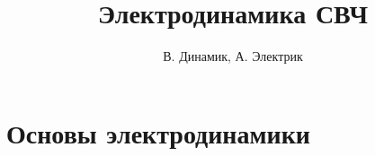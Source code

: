 \documentclass[a4paper, oneside, 12pt]{book}
\begin{document}
\title{Электродинамика СВЧ}
\author{В. Динамик, А. Электрик}
\maketitle

\tableofcontents

\part{Основы электродинамики}


\end{document}
